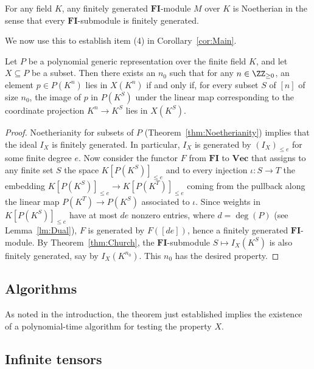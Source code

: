 \documentclass{amsart}
\renewcommand{\Vec}{\mathbf{Vec}}
\newcommand{\FI}{\mathbf{FI}}
\begin{document}
\begin{thm} \label{thm:Church}
For any field $K$, any finitely generated $\FI$-module $M$ 
over $K$ is Noetherian in the sense that every
$\FI$-submodule is finitely generated. 
\end{thm}

We now use this to establish item (4) in
Corollary~\ref{cor:Main}.

\begin{thm}
Let $P$ be a polynomial generic representation over the
finite field $K$, and let $X \subseteq P$ be
a subset. Then there exists an $n_0$ such that for any $n \in \ZZ_{\geq
0}$, an element $p \in P(K^n)$ lies in $X(K^n)$ if and only if, for
every subset $S$ of $[n]$ of size $n_0$, the image of $p$ in $P(K^S)$
under the linear map corresponding to the coordinate projection $K^n
\to K^S$ lies in $X(K^S)$.
\end{thm}

\begin{proof}
Noetherianity for subsets of $P$ (Theorem~\ref{thm:Noetherianity})
implies that the ideal $I_X$ is finitely generated. In particular, $I_X$
is generated by $(I_X)_{\leq e}$ for some finite degree $e$.  Now consider
the functor $F$ from $\FI$ to $\Vec$ that assigns to any finite set $S$
the space $K[P(K^S)]_{\leq e}$ and to every injection $\iota: S \to T$
the embedding $K[P(K^S)]_{\leq e} \to K[P(K^T)]_{\leq e}$ coming from
the pullback along the linear map $P(K^T) \to P(K^S)$ associated to
$\iota$. Since weights in $K[P(K^S)]_{\leq e}$ have at most $de$ nonzero
entries, where $d=\deg(P)$ (see Lemma~\ref{lm:Dual}), $F$ is generated
by $F([de])$, hence a finitely generated $\FI$-module. By
Theorem~\ref{thm:Church}, 
the $\FI$-submodule $S \mapsto I_X(K^S)$ is also finitely generated,
say by $I_X(K^{n_0})$. This $n_0$ has the desired property.
\end{proof}

\subsection{Algorithms}

As noted in the introduction, the theorem just established implies the
existence of a polynomial-time algorithm for testing the
property $X$.

\subsection{Infinite tensors}
\end{document}

